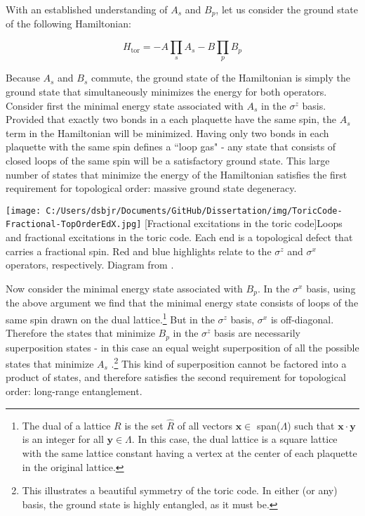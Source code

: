 With an established understanding of $A_{s}$ and $B_{p}$, let us consider the ground state of the following Hamiltonian:

\begin{equation}
H_{\text{tor}} = -A \prod_{s} A_{s} - B \prod_{p} B_{p}
\end{equation}

Because $A_{s}$ and $B_{s}$ commute, the ground state of the Hamiltonian is simply the ground state that simultaneously minimizes the energy for both operators. Consider first the minimal energy state associated with $A_{s}$ in the $\sigma^{z}$ basis. Provided that exactly two bonds in a each plaquette have the same spin, the $A_{s}$ term in the Hamiltonian will be minimized. Having only two bonds in each plaquette with the same spin defines a ``loop gas" - any state that consists of closed loops of the same spin will be a satisfactory ground state. This large number of states that minimize the energy of the Hamiltonian satisfies the first requirement for topological order: massive ground state degeneracy.

\begin{centering}
\texttt{[image: C:/Users/dsbjr/Documents/GitHub/Dissertation/img/ToricCode-Fractional-TopOrderEdX.jpg]}
  \captionsetup{width=0.75\textwidth}
  [Fractional excitations in the toric code]{Loops and fractional excitations in the toric code. Each end is a topological defect that carries a fractional spin. Red and blue highlights relate to the $\sigma^{z}$ and $\sigma^{x}$ operators, respectively. Diagram from \cite{topOrderEdX}.}
  \label{fig:toricCode2}
\end{centering}

Now consider the minimal energy state associated with $B_{p}$. In the $\sigma^{x}$ basis, using the above argument we find that the minimal energy state consists of loops of the same spin drawn on the dual lattice.\footnote{The dual of a lattice $R$ is the set $\hat{R}$ of all vectors $\mathbf{x} \in$ span($\Lambda$) such that $\mathbf{x} \cdot \mathbf{y}$ is an integer for all $\mathbf{y} \in \Lambda$. In this case, the dual lattice is a square lattice with the same lattice constant having a vertex at the center of each plaquette in the original lattice.} But in the $\sigma^{z}$ basis, $\sigma^{x}$ is off-diagonal. Therefore the states that minimize $B_{p}$ in the $\sigma^{z}$ basis are necessarily superposition states - in this case an equal weight superposition of all the possible states that minimize $A_{s}$ \cite{Savary2017}.\footnote{This illustrates a beautiful symmetry of the toric code. In either (or any) basis, the ground state is highly entangled, as it must be.} This kind of superposition cannot be factored into a product of states, and therefore satisfies the second requirement for topological order: long-range entanglement.

